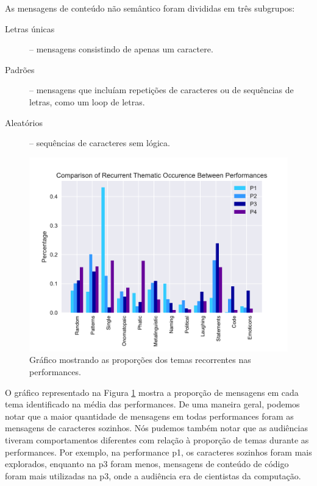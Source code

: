 As mensagens de conteúdo não semântico foram divididas em três subgrupos:

\begin{description}
\item[Letras únicas] -- mensagens consistindo de apenas um caractere.
\item[Padrões] -- mensagens que incluíam repetições de caracteres ou de sequências de letras, como um loop de letras.
\item[Aleatórios] -- sequências de caracteres sem lógica.
\end{description}

\begin{figure}[ht!]

\includegraphics[width=1\linewidth]{pictures/cap3/bar_plot_new_revised}
\caption{Gráfico mostrando as proporções dos temas recorrentes nas performances.}
\label{donut}
\end{figure}

O gráfico representado na Figura \ref{donut} mostra a proporção de mensagens em cada tema identificado na média das performances. De uma maneira geral, podemos notar que a maior quantidade de mensagens em todas performances foram as mensagens de caracteres sozinhos. Nós pudemos também notar que as audiências tiveram comportamentos diferentes com relação à proporção de temas durante as performances. Por exemplo, na performance p1, os caracteres sozinhos foram mais explorados, enquanto na p3 foram menos, mensagens de conteúdo de código foram mais utilizadas na p3, onde a audiência era de cientistas da computação.

